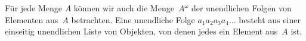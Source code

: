 \documentclass[../../../include/open-logic-section]{subfiles}
\begin{document}
\begin{ex}
Für jede Menge $A$ können wir auch die Menge~$A^\omega$ der unendlichen
Folgen von Elementen aus~$A$ betrachten. Eine unendliche Folge
$a_1a_2a_3a_4\dots$ besteht aus einer einseitig unendlichen Liste von Objekten,
von denen jedes ein Element aus~$A$ ist.
\end{ex}
\end{document}
